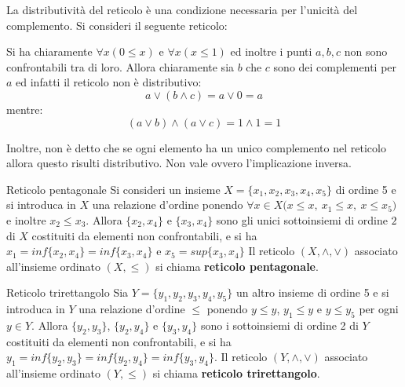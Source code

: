 \begin{example}
	La distributività del reticolo è una condizione necessaria per l'unicità del complemento. Si consideri il seguente reticolo:
	\begin{center}
	\end{center}
	Si ha chiaramente $\forall x(0 \leq x)$  e $\forall x (x \leq 1)$ ed inoltre i punti $a,b,c$ non sono confrontabili tra di loro. Allora chiaramente sia $b$ che $c$ sono dei complementi per $a$ ed infatti il reticolo non è distributivo:
	\begin{displaymath}
		a \vee (b \wedge c) = a \vee 0 = a
	\end{displaymath}
	mentre:
	\begin{displaymath}
		(a \vee b) \wedge (a \vee c) = 1 \wedge 1 = 1
	\end{displaymath}
	
	Inoltre, non è detto che se ogni elemento ha un unico complemento nel reticolo allora questo risulti distributivo. Non vale ovvero l'implicazione inversa.
	
\end{example}

\begin{defbox}{Reticolo pentagonale}
	Si consideri un insieme $X= \{x_{1},x_{2},x_{3},x_{4},x_{5}\}$ di ordine 5 e si introduca in $X$ una relazione d'ordine ponendo $\forall x \in X \bigl(x \leq x, \ x_{1} \leq x, \ x \leq x_{5} \bigr)$ e inoltre $x_{2} \leq x_{3}$. Allora $\{x_{2},x_{4}\}$ e $\{x_{3},x_{4}\}$ sono gli unici sottoinsiemi di ordine $2$ di $X$ costituiti da elementi non confrontabili, e si ha $x_{1}= inf\{x_{2},x_{4}\}=inf\{x_{3},x_{4}\}$ e $x_{5}=sup\{x_{3},x_{4}\}$ Il reticolo $(X,\wedge,\vee)$ associato all'insieme ordinato $(X,\leq)$ si chiama \textbf{reticolo pentagonale}.
\end{defbox}


\begin{defbox}{Reticolo trirettangolo}
	Sia $Y=\{y_{1},y_{2},y_{3},y_{4},y_{5}\}$ un altro insieme di ordine 5 e si introduca in $Y$ una relazione d'ordine $\leq$ ponendo $y \leq y$, $y_{1} \leq y$ e $y \leq y_{5}$ per ogni $y \in Y$. Allora $\{y_{2},y_{3}\}$, $\{y_{2},y_{4}\}$ e $\{y_{3},y_{4}\}$ sono i sottoinsiemi di ordine 2 di $Y$ costituiti da elementi non confrontabili, e si ha $y_{1}=inf\{y_{2},y_{3}\}=inf\{y_{2},y_{4}\}=inf\{y_{3},y_{4}\}$. Il reticolo $(Y,\wedge,\vee)$ associato all'insieme ordinato $(Y,\leq)$ si chiama \textbf{reticolo trirettangolo}.
\end{defbox}


